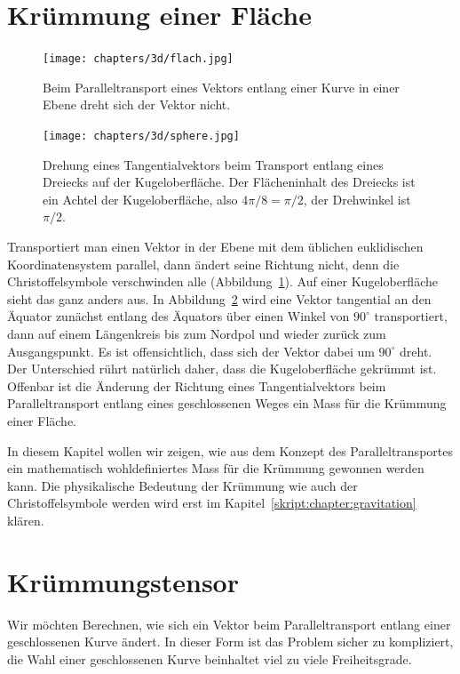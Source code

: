 %
%
%
\section{Krümmung einer Fläche%
\label{skript:kruemmung:section:kruemmung}}

\begin{figure}
\centering
\texttt{[image: chapters/3d/flach.jpg]}
\caption{Beim Paralleltransport eines Vektors entlang einer Kurve in
einer Ebene dreht sich der Vektor nicht.
\label{skript:kruemmung:transportflach}}
\end{figure}

\begin{figure}
\centering
\texttt{[image: chapters/3d/sphere.jpg]}
\caption{Drehung eines Tangentialvektors beim Transport entlang eines
Dreiecks auf der Kugeloberfläche.
Der Flächeninhalt des Dreiecks ist ein Achtel der Kugeloberfläche,
also $4\pi/8=\pi/2$, der Drehwinkel ist $\pi/2$.
\label{skript:kruemmung:transportkugel}}
\end{figure}

Transportiert man einen Vektor in der Ebene mit dem üblichen euklidischen
Koordinatensystem parallel, dann ändert seine Richtung nicht,
denn die Christoffelsymbole verschwinden alle
(Abbildung~\ref{skript:kruemmung:transportflach}).
Auf einer Kugeloberfläche sieht das ganz anders aus.
In Abbildung~\ref{skript:kruemmung:transportkugel} wird
eine Vektor tangential an den Äquator zunächst entlang 
des Äquators über einen Winkel von $90^\circ$ transportiert,
dann auf einem Längenkreis bis zum Nordpol
und wieder zurück zum Ausgangspunkt.
Es ist offensichtlich, dass sich der Vektor dabei um $90^\circ$ dreht. 
Der Unterschied rührt natürlich daher, dass die Kugeloberfläche gekrümmt
ist.
Offenbar ist die Änderung der Richtung eines Tangentialvektors beim
Paralleltransport entlang eines geschlossenen Weges ein Mass für die
Krümmung einer Fläche.

In diesem Kapitel wollen wir zeigen, wie aus dem Konzept des
Paralleltransportes ein mathematisch wohldefiniertes Mass für die
Krümmung gewonnen werden kann.
Die physikalische Bedeutung der Krümmung wie auch der Christoffelsymbole
werden wird erst im Kapitel~\ref{skript:chapter:gravitation} klären.

\section{Krümmungstensor}
Wir möchten Berechnen, wie sich ein Vektor beim Paralleltransport entlang
einer geschlossenen Kurve ändert.
In dieser Form ist das Problem sicher zu kompliziert, die Wahl
einer geschlossenen Kurve beinhaltet viel zu viele Freiheitsgrade.

